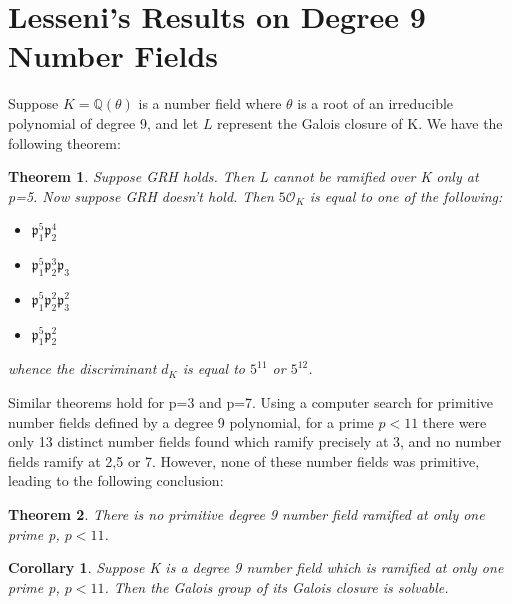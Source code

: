 \documentclass[preprint,12pt,reqno]{elsarticle}
\newtheorem{theorem}{Theorem}
\newtheorem{corollary}{Corollary}[theorem]
\begin{document}
\section{Lesseni's Results on Degree 9 Number Fields}
Suppose $K=\mathbb{Q}(\theta)$ is a number field where $\theta$ is a root of an irreducible polynomial of degree 9, and let $L$ represent the Galois closure of K. We have the following theorem: \begin{theorem}
    Suppose GRH holds. Then L cannot be ramified over K only at p=5. Now suppose GRH doesn't hold. Then $5\mathcal{O}_K$ is equal to one of the following: \begin{itemize}
        \item $\mathfrak{p}_1^5\mathfrak{p}_2^4$
        \item $\mathfrak{p}_1^5\mathfrak{p}_2^3\mathfrak{p}_3$
        \item $\mathfrak{p}_1^5\mathfrak{p}_2^2\mathfrak{p}_3^2$
        \item  $\mathfrak{p}_1^5\mathfrak{p}_2^2$
    \end{itemize}
    whence the discriminant $d_K$ is equal to $5^{11}$ or $5^{12}$. 
\end{theorem}
Similar theorems hold for p=3 and p=7.  Using a computer search for primitive number fields defined by a degree 9 polynomial, for a prime $p<11$ there were only 13 distinct number fields found which ramify precisely at 3, and no number fields ramify at 2,5 or 7. However, none of these number fields was primitive, leading to the following conclusion:
\begin{theorem}
    There is no primitive degree 9 number field ramified at only one prime p, $p<11$.
\end{theorem}
\begin{corollary}
 Suppose K is a degree 9 number field which is ramified at only one prime p, $p<11$. Then the Galois group of its Galois closure is solvable. 
\end{corollary}
\end{document}
